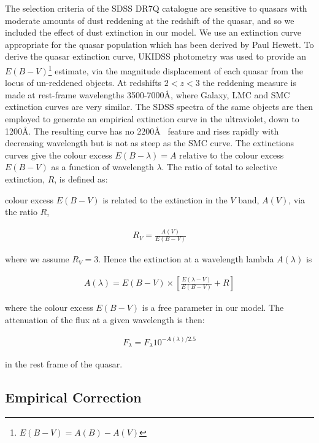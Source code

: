 The selection criteria of the SDSS DR7Q catalogue are sensitive to quasars with moderate amounts of dust reddening \citep[possibly as high as $E(B-V)$ $\sim$ 0.5;][]{richards03} at the redshift of the quasar, and so we included the effect of dust extinction in our model. 
We use an extinction curve appropriate for the quasar population which has been derived by Paul Hewett. 
To derive the quasar extinction curve, UKIDSS photometry was used to provide an $E(B-V)$\footnote{$E(B-V)=A(B)-A(V)$} estimate, via the magnitude displacement of each quasar from the locus of un-reddened objects. 
At redshifts $2 < z < 3$ the reddening measure is made at rest-frame wavelengths 3500-7000\AA, where Galaxy, LMC and SMC extinction curves are very similar. 
The SDSS spectra of the same objects are then employed to generate an empirical extinction curve in the ultraviolet, down to 1200\AA. 
The resulting curve has no 2200\AA~ feature and rises rapidly with decreasing wavelength but is not as steep as the SMC curve. 
The extinctions curves give the colour excess $E(B-\lambda) = A$ relative to the colour excess $E(B-V)$ as a function of wavelength $\lambda$. 
The ratio of total to selective extinction, $R$, is defined as: 

colour excess $E(B-V)$ is related to the extinction in the $V$ band, $A(V)$, via the ratio  $R$, 

\begin{eqnarray}
  R_V = \frac{A(V)}{E(B-V)}
\end{eqnarray}

where we assume $R_V = 3$. 
Hence the extinction at a wavelength lambda $A(\lambda)$ is 

\begin{eqnarray}
  A(\lambda) = E(B-V) \times \left[ \frac{E(\lambda-V)}{E(B-V)} + R \right] 
\end{eqnarray}

where the colour excess $E(B-V)$ is a free parameter in our model. 
The attenuation of the flux at a given wavelength is then:

\begin{eqnarray}
  F_\lambda = F_\lambda10^{-A(\lambda)/2.5}
\end{eqnarray}

in the rest frame of the quasar. 

\subsection{Empirical Correction}

